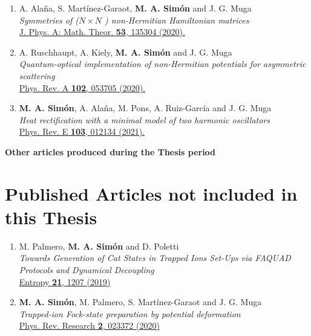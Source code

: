\begin{enumerate}
  \item A. Alaña, S. Mart\'{i}nez-Garaot, {\bf M. A. Sim\'{o}n} and J. G. Muga\\
  {\it Symmetries of (${N \times N}$ ) non-Hermitian Hamiltonian matrices}\\
  \href{https://doi.org/10.1088/1751-8121/ab7781}{J. Phys. A: Math. Theor. {\bf 53}, 135304 (2020).}

  \item A. Ruschhaupt, A. Kiely, {\bf M. A. Sim\'{o}n} and J. G. Muga\\
  {\it Quantum-optical implementation of non-Hermitian potentials for asymmetric scattering}\\
  \href{https://doi.org/10.1103/PhysRevA.102.053705}{Phys. Rev. A {\bf 102}, 053705 (2020).}\\

  \item {\bf M. A. Sim\'{o}n}, A. Alaña, M. Pons, A. Ruiz-Garc\'{i}a and J. G. Muga\\
  {\it Heat rectification with a minimal model of two harmonic oscillators}\\
  \href{https://doi.org/10.1103/PhysRevE.103.012134}{Phys. Rev. E {\bf 103}, 012134 (2021).}

\end{enumerate}

\vspace{1.25 cm}

 {\bf Other articles produced during the Thesis period}
\section*{Published  Articles not included in this Thesis}

\begin{enumerate}

  \item M. Palmero, {\bf M. A. Sim\'{o}n} and D. Poletti\\
  {\it Towards Generation of Cat States in Trapped Ions Set-Ups via FAQUAD Protocols and Dynamical Decoupling}\\
  \href{https://doi.org/10.3390/e21121207}{Entropy {\bf 21}, 1207 (2019)}

  \item {\bf M. A. Sim\'{o}n}, M. Palmero, S. Mart\'{i}nez-Garaot and J. G. Muga\\
  {\it Trapped-ion Fock-state preparation by potential deformation}\\
  \href{https://doi.org/10.1103/PhysRevResearch.2.023372}{Phys. Rev. Research {\bf 2}, 023372 (2020)}

\end{enumerate}
